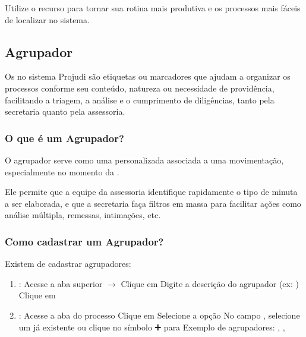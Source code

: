 \documentclass[letterpaper,10pt,brazil]{sphinxmanual}
\begin{document}
\sphinxAtStartPar
Utilize o recurso para tornar sua rotina mais produtiva e os processos mais fáceis de localizar no sistema.

\sphinxstepscope


\subsection{Agrupador}
\label{\detokenize{projud_51_agrupador:agrupador}}\label{\detokenize{projud_51_agrupador::doc}}
\sphinxAtStartPar
Os  no sistema Projudi são etiquetas ou marcadores que ajudam a organizar os processos conforme seu conteúdo, natureza ou necessidade de providência, facilitando a triagem, a análise e o cumprimento de diligências, tanto pela secretaria quanto pela assessoria.


\subsubsection{O que é um Agrupador?}
\label{\detokenize{projud_51_agrupador:o-que-e-um-agrupador}}
\sphinxAtStartPar
O agrupador serve como uma  personalizada associada a uma movimentação, especialmente no momento da .

\sphinxAtStartPar
Ele permite que a equipe da assessoria identifique rapidamente o tipo de minuta a ser elaborada, e que a secretaria faça filtros em massa para facilitar ações como análise múltipla, remessas, intimações, etc.


\subsubsection{Como cadastrar um Agrupador?}
\label{\detokenize{projud_51_agrupador:como-cadastrar-um-agrupador}}
\sphinxAtStartPar
Existem  de cadastrar agrupadores:
\begin{enumerate}
%
\item {} 
\sphinxAtStartPar
{}:
\sphinxhyphen{} Acesse a aba superior  \(\rightarrow\) 
\sphinxhyphen{} Clique em 
\sphinxhyphen{} Digite a descrição do agrupador (ex: )
\sphinxhyphen{} Clique em 

\item {} 
\sphinxAtStartPar
{}:
\sphinxhyphen{} Acesse a aba  do processo
\sphinxhyphen{} Clique em 
\sphinxhyphen{} Selecione a opção 
\sphinxhyphen{} No campo , selecione um já existente ou clique no símbolo ➕ para 
\sphinxhyphen{} Exemplo de agrupadores: , , 

\end{enumerate}
\end{document}
